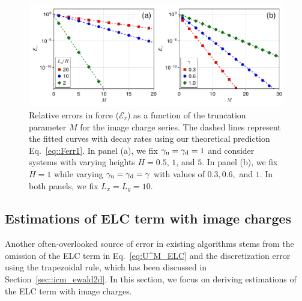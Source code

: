 \begin{figure}[htbp]
    \centering
    \includegraphics[width=0.98\linewidth]{figs/icm_error_force.pdf}
    \caption{
        Relative errors in force ($\mathcal{E}_r$) as a function of the truncation parameter $M$ for the image charge series. 
        The dashed lines represent the fitted curves with decay rates using our theoretical prediction Eq.~\eqref{eq::Ferr1}. 
        In panel (a), we fix $\gamma_{\text{u}} = \gamma_{\text{d}} = 1$ and consider systems with varying heights $H = 0.5$, $1$, and $5$. In panel (b), we fix $H = 1$ while varying $\gamma_{\text{u}} = \gamma_{\text{d}} = \gamma$ with values of $0.3, 0.6,$ and $1$. In both panels, we fix $L_x=L_y=10$.
    }
    \label{fig:icm_error_force}
\end{figure}

\subsection{Estimations of ELC term with image charges}\label{sec:error_reform}

Another often-overlooked source of error in existing algorithms stems from the omission of the ELC term in Eq.~\eqref{eq:U^M_ELC} and the discretization error using the trapezoidal rule, which has been discussed in Section~\ref{sec::icm_ewald2d}. 
In this section, we focus on deriving estimations of the ELC term with image charges.

